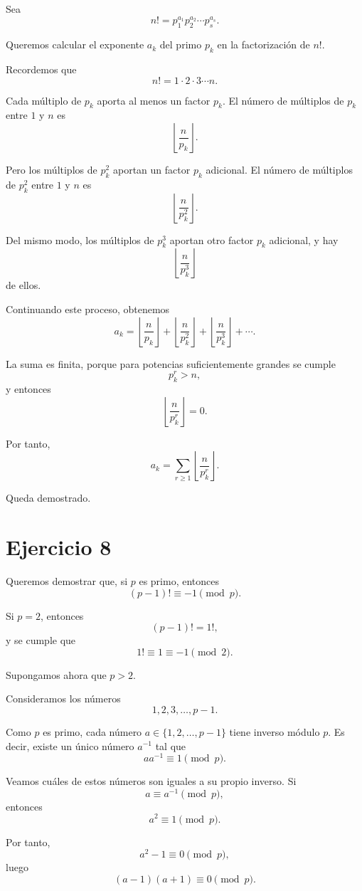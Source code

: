 \documentclass[12pt]{article}
\begin{document}
Sea
\[
n! = p_1^{a_1}p_2^{a_2}\cdots p_s^{a_s}.
\]

Queremos calcular el exponente \(a_k\) del primo \(p_k\) en la factorización de \(n!\).

Recordemos que
\[
n! = 1\cdot 2\cdot 3\cdots n.
\]

Cada múltiplo de \(p_k\) aporta al menos un factor \(p_k\). El número de múltiplos de \(p_k\) entre \(1\) y \(n\) es
\[
\left\lfloor \frac{n}{p_k} \right\rfloor.
\]

Pero los múltiplos de \(p_k^2\) aportan un factor \(p_k\) adicional. El número de múltiplos de \(p_k^2\) entre \(1\) y \(n\) es
\[
\left\lfloor \frac{n}{p_k^2} \right\rfloor.
\]

Del mismo modo, los múltiplos de \(p_k^3\) aportan otro factor \(p_k\) adicional, y hay
\[
\left\lfloor \frac{n}{p_k^3} \right\rfloor
\]
de ellos.

Continuando este proceso, obtenemos
\[
a_k=
\left\lfloor \frac{n}{p_k}\right\rfloor+
\left\lfloor \frac{n}{p_k^2}\right\rfloor+
\left\lfloor \frac{n}{p_k^3}\right\rfloor+\cdots.
\]

La suma es finita, porque para potencias suficientemente grandes se cumple
\[
p_k^r>n,
\]
y entonces
\[
\left\lfloor \frac{n}{p_k^r}\right\rfloor=0.
\]

Por tanto,
\[
a_k=
\sum_{r\geq 1}
\left\lfloor \frac{n}{p_k^r}\right\rfloor.
\]

Queda demostrado.

\section*{Ejercicio 8}

Queremos demostrar que, si \(p\) es primo, entonces
\[
(p-1)! \equiv -1 \pmod p.
\]

Si \(p=2\), entonces
\[
(p-1)!=1!,
\]
y se cumple que
\[
1!\equiv 1 \equiv -1 \pmod 2.
\]

Supongamos ahora que \(p>2\).

Consideramos los números
\[
1,2,3,\dots,p-1.
\]

Como \(p\) es primo, cada número \(a\in\{1,2,\dots,p-1\}\) tiene inverso módulo \(p\). Es decir, existe un único número \(a^{-1}\) tal que
\[
aa^{-1}\equiv 1 \pmod p.
\]

Veamos cuáles de estos números son iguales a su propio inverso. Si
\[
a\equiv a^{-1}\pmod p,
\]
entonces
\[
a^2\equiv 1 \pmod p.
\]

Por tanto,
\[
a^2-1\equiv 0 \pmod p,
\]
luego
\[
(a-1)(a+1)\equiv 0 \pmod p.
\]
\end{document}
